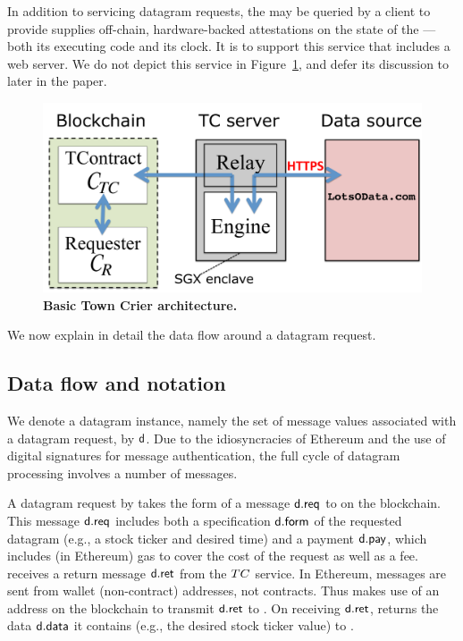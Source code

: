 In addition to servicing datagram requests, the \encname may be queried by a client to provide supplies off-chain, hardware-backed attestations on the state of the \encname---both its executing code and its clock. It is to support this service that \medname includes a web server. We do not depict this service in Figure~\ref{fig:overview}, and defer its discussion to later in the paper.

\vspace{-2mm}
\begin{figure}[h!]
\centering
\includegraphics[width=\columnwidth]{OverviewFig}
\caption{{\bf Basic Town Crier architecture.}}
\label{fig:overview}
\end{figure}
\vspace{-2mm}

We now explain in detail the data flow around a datagram request. 

\subsection{Data flow and notation}

We denote a datagram instance, namely the set of message values associated with a datagram request, by ${\sf d}$. Due to the idiosyncracies of Ethereum and the use of digital signatures for message authentication, the full cycle of datagram processing involves a number of messages. 

A datagram request by \reqcont takes the form of a message ${\sf d.req}$ to \tcont on the blockchain. This message ${\sf d.req}$ includes both a specification ${\sf d.form}$ of the requested datagram (e.g., a stock ticker and desired time) and a payment ${\sf d.pay}$, which includes (in Ethereum) gas to cover the cost of the request as well as a fee. \tcont receives a return message ${\sf d.ret}$ from the $TC$ service. In Ethereum, messages are sent from wallet (non-contract) addresses, not contracts. Thus \tc makes use of an address \tcadd on the blockchain to transmit ${\sf d.ret}$ to \tcont. 
On receiving ${\sf d.ret}$, \tcont returns the data ${\sf d.data}$ it contains (e.g., the desired stock ticker value) to \reqcont. 

